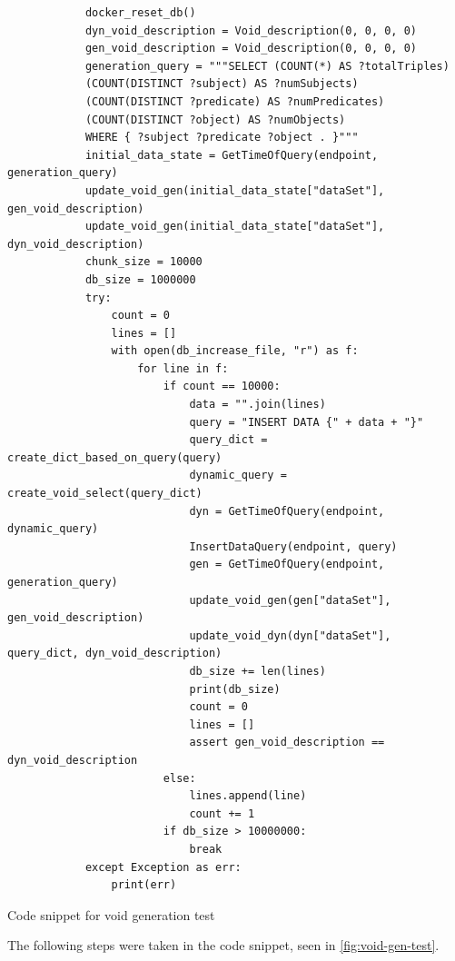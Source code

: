 \begin{listing*}[hbt!]
    \begin{verbatim}
            docker_reset_db()
            dyn_void_description = Void_description(0, 0, 0, 0)
            gen_void_description = Void_description(0, 0, 0, 0)
            generation_query = """SELECT (COUNT(*) AS ?totalTriples) 
            (COUNT(DISTINCT ?subject) AS ?numSubjects)
            (COUNT(DISTINCT ?predicate) AS ?numPredicates)
            (COUNT(DISTINCT ?object) AS ?numObjects) 
            WHERE { ?subject ?predicate ?object . }"""
            initial_data_state = GetTimeOfQuery(endpoint, generation_query)
            update_void_gen(initial_data_state["dataSet"], gen_void_description)
            update_void_gen(initial_data_state["dataSet"], dyn_void_description)
            chunk_size = 10000
            db_size = 1000000
            try:
                count = 0
                lines = []
                with open(db_increase_file, "r") as f:
                    for line in f:
                        if count == 10000:
                            data = "".join(lines)
                            query = "INSERT DATA {" + data + "}"
                            query_dict = create_dict_based_on_query(query)
                            dynamic_query = create_void_select(query_dict)
                            dyn = GetTimeOfQuery(endpoint, dynamic_query)
                            InsertDataQuery(endpoint, query)
                            gen = GetTimeOfQuery(endpoint, generation_query)
                            update_void_gen(gen["dataSet"], gen_void_description)
                            update_void_dyn(dyn["dataSet"], query_dict, dyn_void_description)
                            db_size += len(lines)
                            print(db_size)
                            count = 0
                            lines = []
                            assert gen_void_description == dyn_void_description
                        else:
                            lines.append(line)
                            count += 1
                        if db_size > 10000000:
                            break
            except Exception as err:
                print(err)
    \end{verbatim}
    \caption{Code snippet for \gls{void} generation test}
    \label{fig:void-gen-test}
\end{listing*}

The following steps were taken in the code snippet, seen in \autoref{fig:void-gen-test}.

